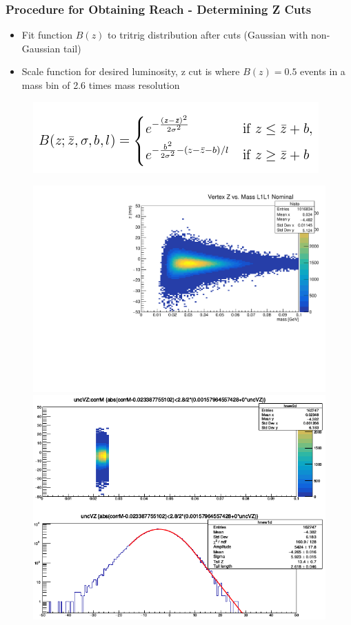 \documentclass{beamer}
\begin{document}
\begin{frame}
\frametitle{Procedure for Obtaining Reach - Determining Z Cuts}
\begin{itemize}
\item Fit function $B(z)$ to tritrig distribution after cuts (Gaussian with non-Gaussian tail)
\item Scale function for desired luminosity, z cut is where $B(z)=0.5$ events in a mass bin of 2.6 times mass resolution
\end{itemize}
\begin{figure}
\includegraphics[width=0.35\linewidth]{figs/function.png}
\end{figure}
\begin{figure}
\includegraphics[width=0.45\linewidth]{figs/L1L1_loose_nom.pdf}
\includegraphics[width=0.4\linewidth]{figs/mass_slice.png}
\end{figure}

\end{frame}

\end{document}

